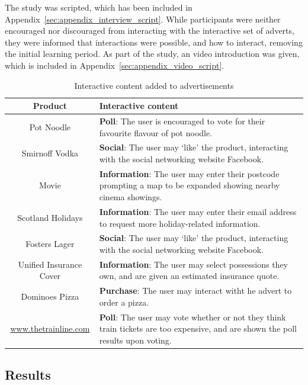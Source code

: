 	The study was scripted, which has been included in Appendix~\ref{sec:appendix_interview_script}. While participants were neither encouraged nor discouraged from interacting with the interactive set of adverts, they were informed that interactions were possible, and how to interact, removing the initial learning period. As part of the study, an video introduction was given, which is included in Appendix~\ref{sec:appendix_video_script}.
	\begin{table}[hb]
		\centering
		\begin{tabularx}{\linewidth}{ c X }
			\toprule
			\bf Product & \bf Interactive content \\
			\midrule
			Pot Noodle & \textbf{Poll}: The user is encouraged to vote for their favourite flavour of pot noodle. \\
			Smirnoff Vodka & \textbf{Social}: The user may `like' the product, interacting with the social networking website Facebook. \\ %
			Movie & \textbf{Information}: The user may enter their postcode prompting a map to be expanded showing nearby cinema showings. \\
			Scotland Holidays & \textbf{Information}: The user may enter their email address to request more holiday-related information. \\
			Fosters Lager & \textbf{Social}: The user may `like' the product, interacting with the social networking website Facebook. \\
			Unified Insurance Cover & \textbf{Information}: The user may select possessions they own, and are given an estimated insurance quote. \\
			Dominoes Pizza & \textbf{Purchase}: The user may interact witht he advert to order a pizza. \\
			\url{www.thetrainline.com} & \textbf{Poll}: The user may vote whether or not they think train tickets are too expensive, and are shown the poll results upon voting. \\
			\bottomrule
		\end{tabularx}
		\caption{Interactive content added to advertisements}
		\label{tab:interactive_content}
	\end{table}

	\subsection{Results}


